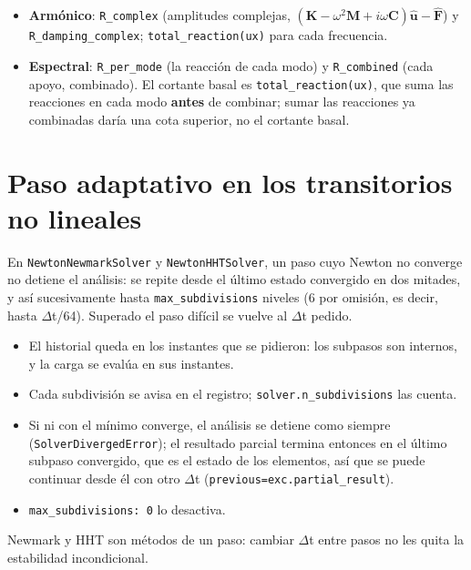 \documentclass[11pt,oneside]{report}
\begin{document}
\begin{itemize}
  \item \textbf{Armónico}: \texttt{R\_complex} (amplitudes complejas, $(\mathbf K - \omega^2\mathbf M + i\omega\mathbf C)\hat{\mathbf u} - \hat{\mathbf F}$) y \texttt{R\_\allowbreak{}damping\_\allowbreak{}complex}; \texttt{total\_\allowbreak{}reaction(\textquotedbl{}ux\textquotedbl{})} para cada frecuencia.
  \item \textbf{Espectral}: \texttt{R\_per\_mode} (la reacción de cada modo) y \texttt{R\_combined} (cada apoyo, combinado). El cortante basal es \texttt{total\_\allowbreak{}reaction(\textquotedbl{}ux\textquotedbl{})}, que suma las reacciones en cada modo \textbf{antes} de combinar; sumar las reacciones ya combinadas daría una cota superior, no el cortante basal.
\end{itemize}

\section{Paso adaptativo en los transitorios no lineales}

En \texttt{NewtonNewmarkSolver} y \texttt{NewtonHHTSolver}, un paso cuyo Newton no converge no detiene el análisis: se repite desde el último estado convergido en dos mitades, y así sucesivamente hasta \texttt{max\_subdivisions} niveles (6 por omisión, es decir, hasta \ensuremath{\Delta}t/64). Superado el paso difícil se vuelve al \ensuremath{\Delta}t pedido.

\begin{itemize}
  \item El historial queda en los instantes que se pidieron: los subpasos son internos, y la carga se evalúa en sus instantes.
  \item Cada subdivisión se avisa en el registro; \texttt{solver.\allowbreak{}n\_\allowbreak{}subdivisions} las cuenta.
  \item Si ni con el mínimo converge, el análisis se detiene como siempre (\texttt{SolverDivergedError}); el resultado parcial termina entonces en el último subpaso convergido, que es el estado de los elementos, así que se puede continuar desde él con otro \ensuremath{\Delta}t (\texttt{previous=exc.\allowbreak{}partial\_\allowbreak{}result}).
  \item \texttt{max\_\allowbreak{}subdivisions: 0} lo desactiva.
\end{itemize}

Newmark y HHT son métodos de un paso: cambiar \ensuremath{\Delta}t entre pasos no les quita la estabilidad incondicional.
\end{document}
